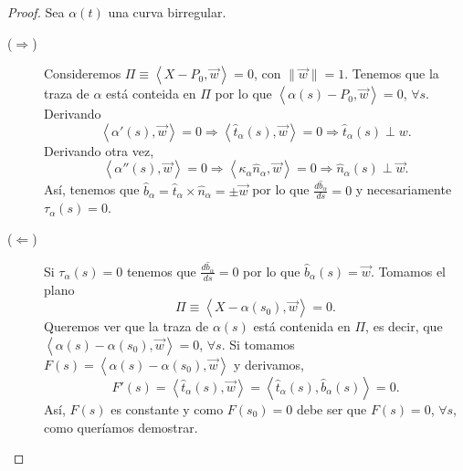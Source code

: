 \begin{proof} Sea $\displaystyle \alpha\left(t\right) $ una curva birregular.
\begin{description}
\item[($\displaystyle \Rightarrow $)] Consideremos $\displaystyle \Pi \equiv \left\langle X-P_{0}, \vec{w} \right\rangle =0 $, con $\displaystyle \|\vec{w}\| = 1 $. Tenemos que la traza de $\displaystyle \alpha  $ está conteida en $\displaystyle \Pi $ por lo que $\displaystyle \left\langle \alpha\left(s\right)-P_{0}, \vec{w} \right\rangle =0 $, $\displaystyle \forall s $. Derivando
	\[\left\langle \alpha'\left(s\right), \vec{w} \right\rangle =0 \Rightarrow \left\langle \hat{t}_{\alpha }\left(s\right), \vec{w} \right\rangle =0 \Rightarrow \hat{t}_{\alpha }\left(s\right)\perp w .\]
	Derivando otra vez,
	\[\left\langle \alpha''\left(s\right), \vec{w} \right\rangle = 0 \Rightarrow \left\langle \kappa_{\alpha }\hat{n}_{\alpha }, \vec{w} \right\rangle = 0 \Rightarrow \hat{n}_{\alpha }\left(s\right)\perp \vec{w} .\]
	Así, tenemos que $\displaystyle \hat{b}_{\alpha }= \hat{t}_{\alpha } \times \hat{n}_{\alpha } = \pm \vec{w} $ por lo que $\displaystyle \frac{d\hat{b}_{\alpha }}{d s}=0 $ y necesariamente $\displaystyle \tau_{\alpha }\left(s\right)=0 $.
\item[($\displaystyle \Leftarrow $)] Si $\displaystyle \tau_{\alpha }\left(s\right)=0 $ tenemos que $\displaystyle \frac{d\hat{b}_{\alpha }}{d s}=0 $ por lo que $\displaystyle \hat{b}_{\alpha }\left(s\right)=\vec{w} $. 
	Tomamos el plano  
	\[\Pi \equiv \left\langle X-\alpha\left(s_{0}\right), \vec{w} \right\rangle =0 .\]
	Queremos ver que la traza de $\displaystyle \alpha\left(s\right) $ está contenida en $\displaystyle \Pi $, es decir, que $\displaystyle \left\langle \alpha\left(s\right)-\alpha\left(s_{0}\right), \vec{w} \right\rangle =0 $, $\displaystyle \forall s $. 
	Si tomamos $\displaystyle F\left(s\right)=\left\langle \alpha\left(s\right)-\alpha\left(s_{0}\right), \vec{w} \right\rangle  $ y derivamos,
	\[F'\left(s\right)=\left\langle \hat{t}_{\alpha }\left(s\right), \vec{w} \right\rangle =\left\langle \hat{t}_{\alpha }\left(s\right), \hat{b}_{\alpha }\left(s\right) \right\rangle =0 .\]
	Así, $\displaystyle F\left(s\right) $ es constante y como $\displaystyle F\left(s_{0}\right)=0 $ debe ser que $\displaystyle F\left(s\right)=0 $, $\displaystyle \forall s  $, como queríamos demostrar.
\end{description}
\end{proof}

